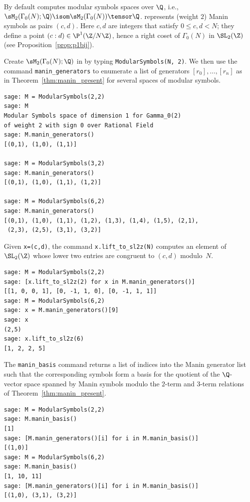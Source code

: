 \begin{example}\label{ex:sagemodsym1}
By default \sage{} computes modular symbols spaces over $\Q$, i.e., 
$\sM_2(\Gamma_0(N);\Q) \isom \sM_2(\Gamma_0(N))\tensor\Q$.
\sage{} represents (weight $2$) Manin symbols as pairs $(c,d)$.
Here $c,d$ are integers that satisfy $0\leq c,d < N$; they define a point
$(c:d) \in \P^1(\Z/N\Z)$, hence a right coset of $\Gamma_0(N)$
in $\SL_2(\Z)$ (see Proposition~\ref{prop:p1bij}).  

Create $\sM_2(\Gamma_0(N);\Q)$ in \sage{} by typing
{\tt ModularSymbols(N, 2)}.  
We then use the \sage{} command {\tt manin\_generators} to enumerate a list
of generators $[r_0], \ldots, [r_n]$ as in
Theorem~\ref{thm:manin_present} for several spaces of modular symbols.
\begin{verbatim}
sage: M = ModularSymbols(2,2)
sage: M
Modular Symbols space of dimension 1 for Gamma_0(2) 
of weight 2 with sign 0 over Rational Field
sage: M.manin_generators()
[(0,1), (1,0), (1,1)]

sage: M = ModularSymbols(3,2)
sage: M.manin_generators()
[(0,1), (1,0), (1,1), (1,2)]

sage: M = ModularSymbols(6,2)
sage: M.manin_generators()
[(0,1), (1,0), (1,1), (1,2), (1,3), (1,4), (1,5), (2,1), 
 (2,3), (2,5), (3,1), (3,2)]
\end{verbatim}

Given {\tt x=(c,d)}, the command {\tt x.lift\_to\_sl2z(N)}
computes an element of $\SL_2(\Z)$ whose lower two entries are
congruent to $(c,d)$ modulo~$N$.
\begin{verbatim}
sage: M = ModularSymbols(2,2)
sage: [x.lift_to_sl2z(2) for x in M.manin_generators()]
[[1, 0, 0, 1], [0, -1, 1, 0], [0, -1, 1, 1]]
sage: M = ModularSymbols(6,2)
sage: x = M.manin_generators()[9]
sage: x
(2,5)
sage: x.lift_to_sl2z(6)
[1, 2, 2, 5]
\end{verbatim}

The {\tt manin\_basis} command returns a list of indices into the
Manin generator list such that the corresponding symbols form a basis
for the quotient of the $\Q$-vector space spanned by Manin symbols
modulo the $2$-term and $3$-term relations of
Theorem~\ref{thm:manin_present}.
\begin{verbatim}
sage: M = ModularSymbols(2,2)
sage: M.manin_basis()
[1]
sage: [M.manin_generators()[i] for i in M.manin_basis()]
[(1,0)]
sage: M = ModularSymbols(6,2)
sage: M.manin_basis()
[1, 10, 11]
sage: [M.manin_generators()[i] for i in M.manin_basis()]
[(1,0), (3,1), (3,2)]
\end{verbatim}%


\end{example}
